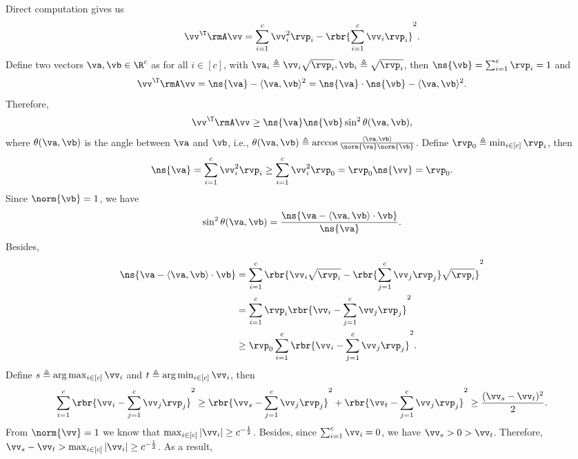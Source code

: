 \begin{proofof}{}
Direct computation gives us
\begin{equation}
\vv^\T\rmA\vv = \sum_{i=1}^c\vv_i^2\rvp_i-\rbr{\sum_{i=1}^c\vv_i\rvp_i}^2.
\end{equation}
Define two vectors $\va,\vb\in\R^c$ as for all $i\in[c]$, with $\va_i\triangleq \vv_i\sqrt{\rvp_i}, \vb_i\triangleq\sqrt{\rvp_i}$, then $\ns{\vb}=\sum_{i=1}^c\rvp_i=1$ and
\begin{equation}
\vv^\T\rmA\vv = \ns{\va}-\langle\va,\vb\rangle^2 = \ns{\va}\cdot\ns{\vb}-\langle \va,\vb\rangle^2.
\end{equation}
Therefore,
\begin{equation}
\vv^\T\rmA\vv \geq \ns{\va}\ns{\vb}\sin^2\theta(\va,\vb),
\end{equation}
where $\theta(\va,\vb)$ is the angle between $\va$ and $\vb$, i.e., $\theta(\va,\vb)\triangleq\arccos\frac{\langle \va,\vb\rangle}{\norm{\va}\norm{\vb}}$.
Define $\rvp_0\triangleq\min_{i\in[c]}\rvp_i$, then
\begin{equation}
\ns{\va} = \sum_{i=1}^c\vv_i^2\rvp_i \geq \sum_{i=1}^c\vv_i^2\rvp_0 = \rvp_0\ns{\vv} = \rvp_0.
\end{equation}
Since $\norm{\vb}=1$, we have
\begin{equation}
\sin^2\theta(\va,\vb) = \frac{\ns{\va-\langle \va,\vb\rangle\cdot \vb}}{\ns{\va}}.
\end{equation}
Besides,
\begin{equation}\begin{split}
\ns{\va-\langle \va,\vb\rangle\cdot \vb} &= \sum_{i=1}^c\rbr{\vv_i\sqrt{\rvp_i}-\rbr{\sum_{j=1}^c\vv_j\rvp_j}\sqrt{\rvp_i}}^2\\
                                 &= \sum_{i=1}^c\rvp_i\rbr{\vv_i-\sum_{j=1}^c\vv_j\rvp_j}^2\\
                                 &\geq \rvp_0\sum_{i=1}^c\rbr{\vv_i-\sum_{j=1}^c\vv_j\rvp_j}^2.
\end{split}\end{equation}
Define $s\triangleq\arg\max_{i\in[c]}{\vv_i}$ and $t\triangleq\arg\min_{i\in[c]}{\vv_i}$, then
\begin{equation}
\sum_{i=1}^c\rbr{\vv_i-\sum_{j=1}^c\vv_j\rvp_j}^2\geq \rbr{\vv_s-\sum_{j=1}^c\vv_j\rvp_j}^2 + \rbr{\vv_t-\sum_{j=1}^c\vv_j\rvp_j}^2 \geq \frac{(\vv_s-\vv_t)^2}{2}.
\end{equation}
From $\norm{\vv}=1$ we know that $\max_{i\in[c]}|\vv_i|\geq c^{-\frac12}$. Besides, since $\sum_{i=1}^c\vv_i=0$, we have $\vv_s>0>\vv_t$. Therefore, $\vv_s-\vv_t>\max_{i\in[c]}|\vv_i|\geq c^{-\frac12}$. As a result,

\end{proofof}
